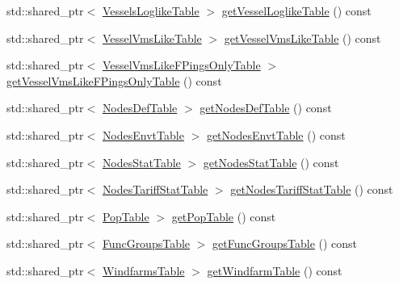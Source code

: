 \begin{DoxyCompactItemize}
\item 
std\+::shared\+\_\+ptr$<$ \mbox{\hyperlink{class_vessels_loglike_table}{Vessels\+Loglike\+Table}} $>$ \mbox{\hyperlink{class_s_q_lite_output_storage_a977e6ceb02291855cdef83cccb66f3a9}{get\+Vessel\+Loglike\+Table}} () const
\item 
std\+::shared\+\_\+ptr$<$ \mbox{\hyperlink{class_vessel_vms_like_table}{Vessel\+Vms\+Like\+Table}} $>$ \mbox{\hyperlink{class_s_q_lite_output_storage_a228a4768d65e3363df180d8b9e556696}{get\+Vessel\+Vms\+Like\+Table}} () const
\item 
std\+::shared\+\_\+ptr$<$ \mbox{\hyperlink{class_vessel_vms_like_f_pings_only_table}{Vessel\+Vms\+Like\+F\+Pings\+Only\+Table}} $>$ \mbox{\hyperlink{class_s_q_lite_output_storage_aecf6b7dff5309665248abcbc037aa762}{get\+Vessel\+Vms\+Like\+F\+Pings\+Only\+Table}} () const
\item 
std\+::shared\+\_\+ptr$<$ \mbox{\hyperlink{class_nodes_def_table}{Nodes\+Def\+Table}} $>$ \mbox{\hyperlink{class_s_q_lite_output_storage_a182efeb3f844008fe576016ebeccb1fc}{get\+Nodes\+Def\+Table}} () const
\item 
std\+::shared\+\_\+ptr$<$ \mbox{\hyperlink{class_nodes_envt_table}{Nodes\+Envt\+Table}} $>$ \mbox{\hyperlink{class_s_q_lite_output_storage_ae46fbee2513b45860f9f310a089ba87f}{get\+Nodes\+Envt\+Table}} () const
\item 
std\+::shared\+\_\+ptr$<$ \mbox{\hyperlink{class_nodes_stat_table}{Nodes\+Stat\+Table}} $>$ \mbox{\hyperlink{class_s_q_lite_output_storage_ab29b6e0c9169e04f67f19f5b09ae3dff}{get\+Nodes\+Stat\+Table}} () const
\item 
std\+::shared\+\_\+ptr$<$ \mbox{\hyperlink{class_nodes_tariff_stat_table}{Nodes\+Tariff\+Stat\+Table}} $>$ \mbox{\hyperlink{class_s_q_lite_output_storage_a820656892a8258bbda69f70d56701347}{get\+Nodes\+Tariff\+Stat\+Table}} () const
\item 
std\+::shared\+\_\+ptr$<$ \mbox{\hyperlink{class_pop_table}{Pop\+Table}} $>$ \mbox{\hyperlink{class_s_q_lite_output_storage_a0764d947298bdd4c9a9eb2451573ce39}{get\+Pop\+Table}} () const
\item 
std\+::shared\+\_\+ptr$<$ \mbox{\hyperlink{class_func_groups_table}{Func\+Groups\+Table}} $>$ \mbox{\hyperlink{class_s_q_lite_output_storage_a81a6dd6bdf2e3f23017965853824099a}{get\+Func\+Groups\+Table}} () const
\item 
std\+::shared\+\_\+ptr$<$ \mbox{\hyperlink{class_windfarms_table}{Windfarms\+Table}} $>$ \mbox{\hyperlink{class_s_q_lite_output_storage_a60df9d35d3dfb8b5be5d6825d599ac0a}{get\+Windfarm\+Table}} () const

\end{DoxyCompactItemize}
